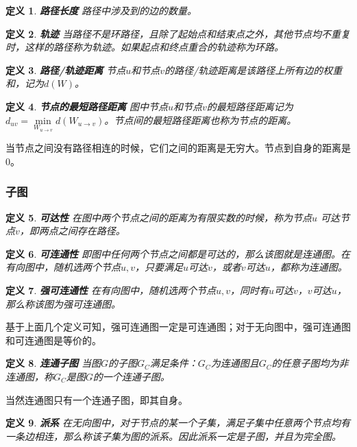 \documentclass{ctexart}
\newtheorem{Definition}{\hspace{2em}定义}[section]
\begin{document}
                \begin{Definition}
                    \textbf{路径长度} 路径中涉及到的边的数量。
                \end{Definition}
                \begin{Definition}
                    \textbf{轨迹} 当路径不是环路径，且除了起始点和结束点之外，其他节点均不重复时，这样的路径称为轨迹。如果起点和终点重合的轨迹称为环路。
                \end{Definition}
                \begin{Definition}
                    \textbf{路径/轨迹距离} 节点$u$和节点$v$的路径/轨迹距离是该路径上所有边的权重和，记为$d(W)$。
                \end{Definition}
                \begin{Definition}
                    \textbf{节点的最短路径距离} 图中节点$u$和节点$v$的最短路径距离记为$d_{uv}=\min\limits_{W_{u\rightarrow v}}d(W_{u \rightarrow v})$。节点间的最短路径距离也称为节点的距离。
                \end{Definition}
                当节点之间没有路径相连的时候，它们之间的距离是无穷大。节点到自身的距离是0。
            \subsubsection{子图}
                \begin{Definition}
                    \textbf{可达性} 在图中两个节点之间的距离为有限实数的时候，称为节点$u$ 可达节点$v$，即两点之间存在路径。
                \end{Definition}
                \begin{Definition}
                    \textbf{可连通性} 即图中任何两个节点之间都是可达的，那么该图就是连通图。在有向图中，随机选两个节点$u,v$，只要满足$u$可达$v$，或者$v$可达$u$，都称为连通图。
                \end{Definition}
                \begin{Definition}
                    \textbf{强可连通性} 在有向图中，随机选两个节点$u,v$，同时有$u$可达$v$，$v$可达$u$，那么称该图为强可连通图。
                \end{Definition}
                基于上面几个定义可知，强可连通图一定是可连通图；对于无向图中，强可连通图和可连通图是等价的。
                \begin{Definition}
                    \textbf{连通子图} 当图$G$的子图$G_C$满足条件：$G_C$为连通图且$G_C$的任意子图均为非连通图，称$G_C$是图$G$的一个连通子图。
                \end{Definition}
                当然连通图只有一个连通子图，即其自身。
                \begin{Definition}
                    \textbf{派系} 在无向图中，对于节点的某一个子集，满足子集中任意两个节点均有一条边相连，那么称该子集为图的派系。因此派系一定是子图，并且为完全图。
                \end{Definition}
\end{document}
